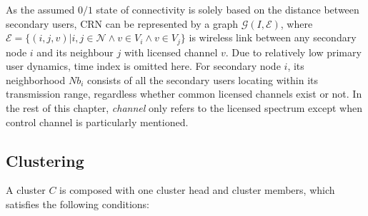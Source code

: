 As the assumed $0/1$ state of connectivity is solely based on the distance between secondary users, CRN can be represented by a graph $\mathcal{G}(I,\mathcal{E})$, where $\mathcal{E}=\lbrace(i,j,v) \vert i, j \in \mathcal{N} \wedge v\in V_i \wedge v\in V_j \rbrace$ is wireless link between any secondary node $i$ and its neighbour $j$ with licensed channel $v$.
Due to relatively low primary user dynamics, time index is omitted here.
For secondary node $i$, its neighborhood $Nb_i$ consists of all the secondary users locating within its transmission range, regardless whether common licensed channels exist or not. 
In the rest of this chapter, \textit{channel} only refers to the licensed spectrum except when control channel is particularly mentioned.

\subsection{Clustering}
A cluster $C$ is composed with one cluster head and cluster members, which satisfies the following conditions:


